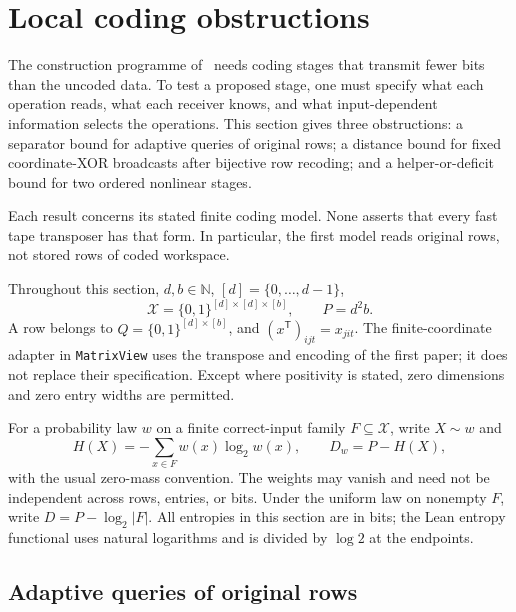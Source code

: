 \section{Local coding obstructions}\label{sec:local-coding}

The construction programme of~\cite{FirstPaper2026} needs coding stages that
transmit fewer bits than the uncoded data.  To test a proposed stage, one must
specify what each operation reads, what each receiver knows, and what
input-dependent information selects the operations.  This section gives three
obstructions: a separator bound for adaptive queries of original rows; a
distance bound for fixed coordinate-XOR broadcasts after bijective row
recoding; and a helper-or-deficit bound for two ordered nonlinear stages.

Each result concerns its stated finite coding model.  None asserts that every
fast tape transposer has that form.  In particular, the first model reads
original rows, not stored rows of coded workspace.

Throughout this section, $d,b\in\mathbb N$, $[d]=\{0,\ldots,d-1\}$,
\[
  \mathcal X=\{0,1\}^{[d]\times[d]\times[b]},\qquad P=d^2b.
\]
A row belongs to $Q=\{0,1\}^{[d]\times[b]}$, and
$(x^{\mathsf T})_{ijt}=x_{jit}$.  The finite-coordinate adapter in
\texttt{MatrixView} uses the transpose and encoding of the first paper; it
does not replace their specification.  Except where positivity is stated,
zero dimensions and zero entry widths are permitted.

For a probability law $w$ on a finite correct-input family $F\subseteq\mathcal X$,
write $X\sim w$ and
\[
  H(X)=-\sum_{x\in F}w(x)\log_2 w(x),\qquad D_w=P-H(X),
\]
with the usual zero-mass convention.  The weights may vanish and need not be
independent across rows, entries, or bits.  Under the uniform law on nonempty
$F$, write $D=P-\log_2|F|$.  All entropies in this section are in bits; the Lean
entropy functional uses natural logarithms and is divided by $\log 2$ at the
endpoints.

\subsection{Adaptive queries of original rows}\label{subsec:local-adaptive}

